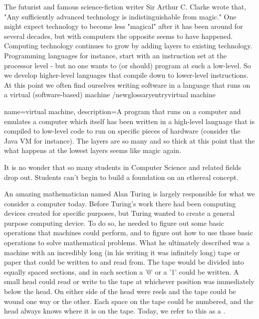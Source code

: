 \documentclass[11pt,fleqn]{book} %
\begin{document}
The futurist and famous science-fiction writer Sir Arthur C. Clarke wrote that, "Any sufficiently advanced technology is indistinguishable from magic."  One might expect technology to become less "magical" after it has been around for several decades, but with computers the opposite seems to have happened.  Computing technology continues to grow by adding layers to existing technology.  Programming languages for instance, start with an instruction set at the processor level - but no one wants to (or should) program at such a low-level.  So we develop higher-level languages that compile down to lower-level instructions. At this point we often find ourselves writing software in a language that runs on a virtual (software-based) machine /newglossaryentry{virtual machine}{ name=virtual machine, description={A program that runs on a computer and emulates a computer} which itself has been written in a high-level language that is compiled to low-level code to run on specific pieces of hardware (consider the Java VM for instance).  The layers are so many and so thick at this point that the what happens at the lowest layers seems like magic again. 

It is no wonder that so many students in Computer Science and related fields drop out.  Students can't begin to build a foundation on an ethereal concept.

An amazing mathematician named Alan Turing is largely responsible for what we consider a computer today.  Before Turing's work there had been computing devices created for specific purposes, but Turing wanted to create a general purpose computing device.  To do so, he needed to figure out some basic operations that machines could perform, and to figure out how to use those basic operations to solve mathematical problems.  What he ultimately described was a machine with an incredibly long (in his writing it was infinitely long) tape or paper that could be written to and read from.  The tape would be divided into equally spaced sections, and in each section a '0' or a '1' could be written.  A small head could read or write to the tape at whichever position was immediately below the head.  On either side of the head were reels and the tape could be wound one way or the other.  Each space on the tape could be numbered, and the head always knows where it is on the tape.  Today, we refer to this as a .

}
\end{document}
